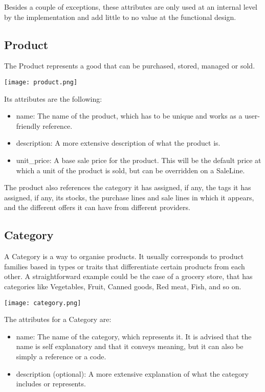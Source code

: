 Besides a couple of exceptions, these attributes are only used at an internal level by the implementation and add little to no value at the functional design.

\subsection{Product}
The Product represents a good that can be purchased, stored, managed or sold. 
\begin{center}
\texttt{[image: product.png]}
\end{center}
Its attributes are the following:

\begin{itemize}
\item name: The name of the product, which has to be unique and works as a user-friendly reference.
\item description: A more extensive description of what the product is.
\item unit\_price: A base sale price for the product. This will be the default price at which a unit of the product is sold, but can be overridden on a SaleLine.
\end{itemize}

The product also references the category it has assigned, if any, the tags it has assigned, if any, its stocks, the purchase lines and sale lines in which it appears, and the different offers it can have from different providers.

\subsection{Category}
A Category is a way to organise products. It usually corresponds to product families based in types or traits that differentiate certain products from each other. A straightforward example could be the case of a grocery store, that has categories like Vegetables, Fruit, Canned goods, Red meat, Fish, and so on. 
\begin{center}
\texttt{[image: category.png]}
\end{center}
The attributes for a Category are:

\begin{itemize}
\item name: The name of the category, which represents it. It is advised that the name is self explanatory and that it conveys meaning, but it can also be simply a reference or a code.
\item description (optional): A more extensive explanation of what the category includes or represents.
\end{itemize}

